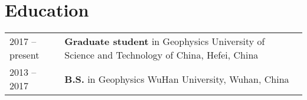 \section*{Education}
\begin{tabular}{p{} p{}}
2017 -- present & \textbf{Graduate student} in Geophysics \newline
       University of Science and Technology of China, Hefei, China \\

2013 -- 2017 & \textbf{B.S.} in Geophysics \newline
       WuHan University, Wuhan, China
\end{tabular}
